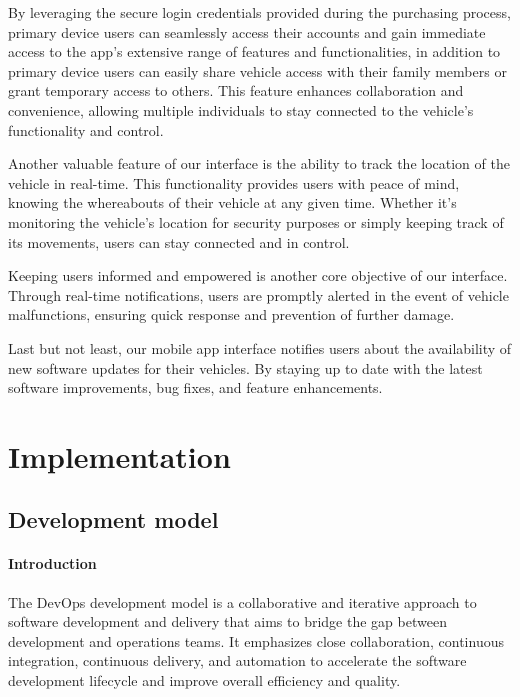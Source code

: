 \documentclass[
12pt,
oneside, 
onehalfspacing, 
nolistspacing, 
parskip, 
chapterinoneline, 
]{AASTCOMPUTER}
\begin{document}
By leveraging the secure login credentials provided during the purchasing process, primary device users can seamlessly access their accounts and gain immediate access to the app's extensive range of features and functionalities, in addition to primary device users can easily share vehicle access with their family members or grant temporary access to others. This feature enhances collaboration and convenience, allowing multiple individuals to stay connected to the vehicle's functionality and control.

Another valuable feature of our interface is the ability to track the location of the vehicle in real-time. This functionality provides users with peace of mind, knowing the whereabouts of their vehicle at any given time. Whether it's monitoring the vehicle's location for security purposes or simply keeping track of its movements, users can stay connected and in control.

Keeping users informed and empowered is another core objective of our interface. Through real-time notifications, users are promptly alerted in the event of vehicle malfunctions, ensuring quick response and prevention of further damage.

Last but not least, our mobile app interface notifies users about the availability of new software updates for their vehicles. By staying up to date with the latest software improvements, bug fixes, and feature enhancements.

\chapter{Implementation}

\section{Development model}

\subsubsection{Introduction}
The DevOps \cite{ebert2016devops} development model is a collaborative and iterative approach to software development and delivery that aims to bridge the gap between development and operations teams. It emphasizes close collaboration, continuous integration, continuous delivery, and automation to accelerate the software development lifecycle and improve overall efficiency and quality.
\end{document}
